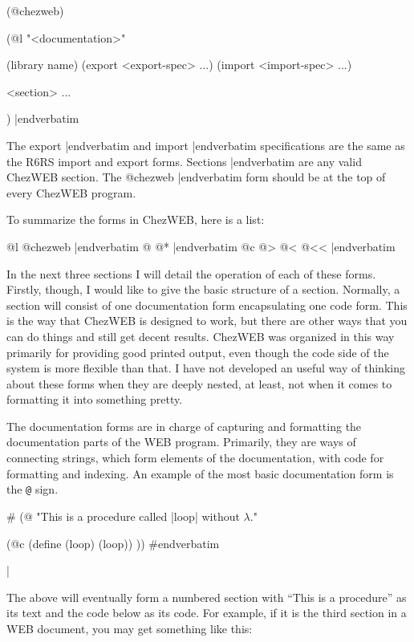 \medskip\verbatim
(@chezweb)

(@l "<documentation>"

(library name)
(export <export-spec> ...)
(import <import-spec> ...)

<section> ...

)
|endverbatim
\medskip

\noindent
The 
\verbatim export |endverbatim 
and 
\verbatim import |endverbatim 
specifications are the same as the R6RS import and
export forms.  
\verbatim Sections |endverbatim 
are any valid ChezWEB
section.  The 
\verbatim @chezweb |endverbatim 
form should be at the top
of every ChezWEB program.

To summarize the forms in ChezWEB, here is a list:

\medskip
{}
\verbatim @l @chezweb |endverbatim
\verbatim @ @* |endverbatim
\verbatim @c @> @< @<< |endverbatim
\medskip

\noindent
In the next three sections I will detail the operation of each of
these forms.  Firstly, though, I would like to give the basic
structure of a section.  Normally, a section will consist of one
documentation form encapsulating one code form.  This is the way that
ChezWEB is designed to work, but there are other ways that you can do
things and still get decent results.  ChezWEB was organized in this
way primarily for providing good printed output, even though the code
side of the system is more flexible than that.  I have not developed
an useful way of thinking about these forms when they are deeply
nested, at least, not when it comes to formatting it into something
pretty.

%
The documentation forms are in charge of capturing and formatting the
documentation parts of the WEB program.  Primarily, they are ways of
connecting strings, which form elements of the documentation, with
code for formatting and indexing.  An example of the most basic
documentation form is the {\tt @} sign.

\verbatimescapechar \#
\medskip\verbatim
(@
"This is a procedure called |loop|
without $\lambda$."

(@c
(define (loop) (loop))
))
#endverbatim
\medskip

\verbatimescapechar |

\noindent
The above will eventually form a numbered section with ``This is a
procedure'' as its text and the code below as its code.  For example,
if it is the third section in a WEB document, you may get something
like this:

